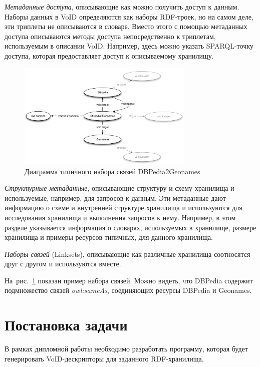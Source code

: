 \documentclass[a4paper, final, 14 pt]{extarticle}
\begin{document}
\emph{Метаданные доступа}, описывающие как можно получить доступ к данным. Наборы данных в VoID 
определяются как наборы RDF-троек, но на самом деле, эти триплеты не описываются в словаре. Вместо
этого с помощью метаданных доступа описываются методы доступа непосредственно к триплетам, используемым
в описании VoID. Например, здесь можно указать SPARQL-точку доступа, которая предоставляет доступ к
описываемому хранилищу. 

\begin{figure}[ht]
  \centering
  \includegraphics[width=0.75\textwidth]{linkset.png}
  \caption{Диаграмма типичного набора связей DBPedia2Geonames}
  \label{lod:linkset}
\end{figure}

\emph{Структурные метаданные}, описывающие структуру и схему хранилища и используемые, например,
для запросов к данным. Эти метаданные дают информацию о схеме и внутренней структуре хранилища и 
используются для исследования хранилища и выполнения запросов к нему. Например, в этом разделе 
указывается информация о словарях, используемых в хранилище, размере хранилища и примеры ресурсов
типичных, для данного хранилища.

\emph{Наборы связей} (Linksets), описывающие как различные хранилища соотносятся друг с другом и 
используются вместе.

На~рис.~\ref{lod:linkset} показан пример набора связей. Можно видеть, что DBPedia содержит подмножество
связей \emph{owl:sameAs}, соединяющих ресурсы DBPedia и Geonames.



\newpage
\section{Постановка задачи}
В рамках дипломной работы необходимо разработать программу, которая будет генерировать VoID-дескрипторы
для заданного RDF-хранилища.
\end{document}

